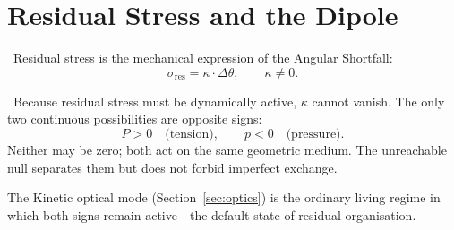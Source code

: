 \section{Residual Stress and the Dipole}
\label{sec:residual}

\begin{definition}
\derived\ Residual stress is the mechanical expression of the Angular Shortfall:
\[
\sigma_{\mathrm{res}}=\kappa\cdot\Delta\theta,\qquad\kappa\neq 0.
\]
\end{definition}

\begin{proposition}
\derived\ Because residual stress must be dynamically active, $\kappa$ cannot
vanish. The only two continuous possibilities are opposite signs:
\[
P>0\quad\text{(tension)},\qquad p<0\quad\text{(pressure)}.
\]
Neither may be zero; both act on the same geometric medium. The unreachable null
separates them but does not forbid imperfect exchange.
\end{proposition}

The Kinetic optical mode (Section~\ref{sec:optics}) is the ordinary living regime
in which both signs remain active---the default state of residual organisation.

